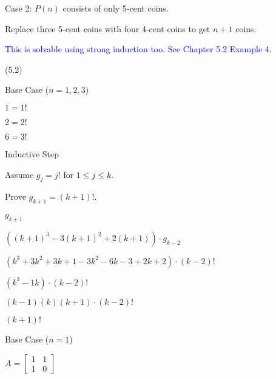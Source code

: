 \documentclass{exam}
\begin{document}
\begin{questions}
\begin{center}
Case 2: \(P(n)\) consists of only 5-cent coins.

Replace three 5-cent coins with four 4-cent coins to get \(n+1\) coins.

\textcolor{blue}{This is solvable using strong induction too. See Chapter 5.2 Example 4.}

\end{center}

\newpage

 (5.2)

\begin{center}
Base Case (\(n = 1, 2, 3\))

\(1 = 1!\)

\(2 = 2!\)

\(6 = 3!\)
\vspace{5px}

Inductive Step

Assume \( g_j = j! \) for \(1 \leq j \leq k\).

Prove \( g_{k+1} = (k+1)! \).

\(g_{k+1}\)

\(((k+1)^3 - 3(k+1)^2 + 2(k+1)) \cdot g_{k-2} \)

\((k^3 + 3k^2 + 3k + 1 - 3k^2 - 6k - 3 + 2k + 2) \cdot (k-2)! \)

\((k^3 - 1k) \cdot (k-2)! \)

\( (k-1)(k)(k+1) \cdot (k-2)! \)

\( (k+1)! \)

\end{center}


\begin{center}
Base Case (\(n = 1\))

\( A =
\begin{bmatrix}
1 & 1\\
1 & 0
\end{bmatrix}
\)


\end{center}
\end{questions}
\end{document}
